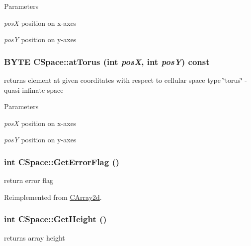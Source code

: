 \begin{DoxyParams}{Parameters}
\item[{\em posX}]position on x-\/axes \item[{\em posY}]position on y-\/axes \end{DoxyParams}
\hypertarget{classCSpace_a7c0381e6e90fc56a8213fba4b047649e}{
\subsubsection[{atTorus}]{\setlength{\rightskip}{0pt plus 5cm}BYTE CSpace::atTorus (int {\em posX}, \/  int {\em posY}) const}}
\label{classCSpace_a7c0381e6e90fc56a8213fba4b047649e}
returns element at given coorditates with respect to cellular space type \char`\"{}torus\char`\"{} -\/ quasi-\/infinate space


\begin{DoxyParams}{Parameters}
\item[{\em posX}]position on x-\/axes \item[{\em posY}]position on y-\/axes \end{DoxyParams}
\hypertarget{classCSpace_afe1840ea70f14055a39090ceaec9778e}{
\subsubsection[{GetErrorFlag}]{\setlength{\rightskip}{0pt plus 5cm}int CSpace::GetErrorFlag ()}}
\label{classCSpace_afe1840ea70f14055a39090ceaec9778e}
return error flag 

Reimplemented from \hyperlink{classCArray2d_afee234adb0190a1d8f3841f75a295e26}{CArray2d}.\hypertarget{classCSpace_a00b9bce5ca8303b7bae59e2ab6ce98be}{
\subsubsection[{GetHeight}]{\setlength{\rightskip}{0pt plus 5cm}int CSpace::GetHeight ()}}
\label{classCSpace_a00b9bce5ca8303b7bae59e2ab6ce98be}
returns array height 

